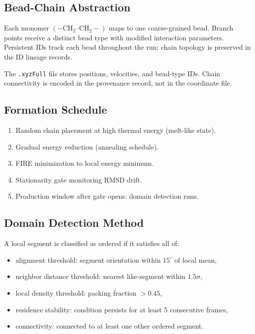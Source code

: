 \documentclass[12pt]{article}
\newcommand{\xyzfull}{\texttt{.xyzFull}}
\begin{document}
\subsection{Bead-Chain Abstraction}

Each monomer $(-\mathrm{CH}_2\text{--}\mathrm{CH}_2-)$ maps to one coarse-grained bead.
Branch points receive a distinct bead type with modified interaction parameters.
Persistent IDs track each bead throughout the run; chain topology is preserved
in the ID lineage records.

The \xyzfull{} file stores positions, velocities, and bead-type IDs.
Chain connectivity is encoded in the provenance record, not in the coordinate file.

\subsection{Formation Schedule}

\begin{enumerate}[noitemsep]
	\item Random chain placement at high thermal energy (melt-like state).
	\item Gradual energy reduction (annealing schedule).
	\item FIRE minimization to local energy minimum.
	\item Stationarity gate monitoring RMSD drift.
	\item Production window after gate opens: domain detection runs.
\end{enumerate}

\subsection{Domain Detection Method}

A local segment is classified as ordered if it satisfies all of:

\begin{itemize}[noitemsep]
	\item alignment threshold: segment orientation within $15^\circ$ of local mean,
	\item neighbor distance threshold: nearest like-segment within $1.5\sigma$,
	\item local density threshold: packing fraction $> 0.45$,
	\item residence stability: condition persists for at least 5 consecutive frames,
	\item connectivity: connected to at least one other ordered segment.
\end{itemize}
\end{document}
